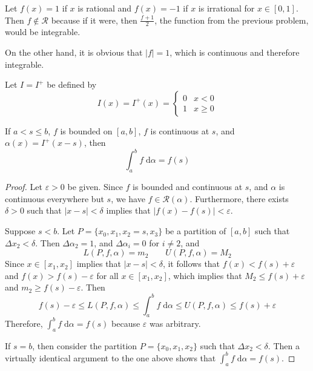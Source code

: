 \documentclass{homework}
\begin{document}
	
	Let $f(x) = 1$ if $x$ is rational and $f(x) = -1$ if $x$ is irrational for $x \in [0,1]$. Then $f \notin \mathscr{R}$ because if it were, then $\frac{f+1}{2}$, the function from the previous problem, would be integrable.
	
	On the other hand, it is obvious that $|f| = 1$, which is continuous and therefore integrable.
	
	
	Let $I = I^+$ be defined by
	$$
	I(x) = I^+(x) = \begin{cases}
		0 & x < 0\\
		1 & x \ge 0
	\end{cases}
	$$
	
	\begin{alphaparts}
		\questionpart %
	
		If $a < s \le b$, $f$ is bounded on $[a,b]$, $f$ is continuous at $s$, and $\alpha(x) = I^+(x-s)$, then
		$$
		\int_a^b f\;\text{d}\alpha = f(s)
		$$
		
		\begin{proof}
			Let $\varepsilon > 0$ be given. Since $f$ is bounded and continuous at $s$, and $\alpha$ is continuous everywhere but $s$, we have $f \in \mathscr{R}(\alpha)$. Furthermore, there exists $\delta > 0$ such that $|x - s| <\delta$ implies that $|f(x) - f(s)| < \varepsilon$. 
			
			Suppose $s < b$. Let $P = \{x_0, x_1, x_2=s, x_3\}$ be a partition of $[a,b]$ such that $\Delta x_2 < \delta$. Then $\Delta \alpha_2 = 1$, and $\Delta \alpha_i = 0$ for $i \ne 2$, and
			$$
			L(P,f,\alpha) = m_2 \qquad U(P,f,\alpha)=M_2
			$$
			Since $x \in [x_1, x_2]$ implies that $|x - s| < \delta$, it follows that $f(x) < f(s) + \varepsilon$ and $f(x) > f(s) - \varepsilon$ for all $x \in [x_1,x_2]$, which implies that $M_2 \le f(s) + \varepsilon$ and $m_2 \ge f(s) - \varepsilon$. Then
			$$
			f(s) - \varepsilon \le L(P,f,\alpha) \le \int_a^b f\;\text{d}\alpha \le U(P,f,\alpha) \le f(s) + \varepsilon
			$$
			Therefore, $\int_a^b f\;\text{d}\alpha = f(s)$ because $\varepsilon$ was arbitrary.
			
			If $s = b$, then consider the partition $P = \{x_0, x_1, x_2\}$ such that $\Delta x_2 < \delta$. Then a virtually identical argument to the one above shows that $\int_a^b f\;\text{d}\alpha = f(s)$.
		\end{proof}
		
		\questionpart %
		

\end{alphaparts}
\end{document}
